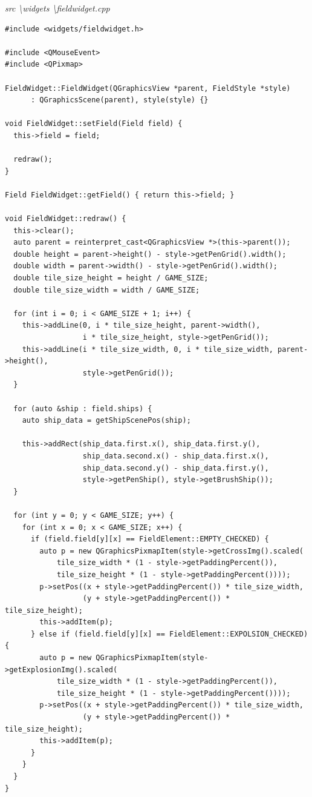 \documentclass[a4paper,14pt]{extarticle}
\begin{document}
\textit{src \textbackslash widgets \textbackslash fieldwidget.cpp}
\begin{verbatim}
#include <widgets/fieldwidget.h>

#include <QMouseEvent>
#include <QPixmap>

FieldWidget::FieldWidget(QGraphicsView *parent, FieldStyle *style)
      : QGraphicsScene(parent), style(style) {}

void FieldWidget::setField(Field field) {
  this->field = field;

  redraw();
}

Field FieldWidget::getField() { return this->field; }

void FieldWidget::redraw() {
  this->clear();
  auto parent = reinterpret_cast<QGraphicsView *>(this->parent());
  double height = parent->height() - style->getPenGrid().width();
  double width = parent->width() - style->getPenGrid().width();
  double tile_size_height = height / GAME_SIZE;
  double tile_size_width = width / GAME_SIZE;

  for (int i = 0; i < GAME_SIZE + 1; i++) {
    this->addLine(0, i * tile_size_height, parent->width(),
                  i * tile_size_height, style->getPenGrid());
    this->addLine(i * tile_size_width, 0, i * tile_size_width, parent->height(),
                  style->getPenGrid());
  }

  for (auto &ship : field.ships) {
    auto ship_data = getShipScenePos(ship);

    this->addRect(ship_data.first.x(), ship_data.first.y(),
                  ship_data.second.x() - ship_data.first.x(),
                  ship_data.second.y() - ship_data.first.y(),
                  style->getPenShip(), style->getBrushShip());
  }

  for (int y = 0; y < GAME_SIZE; y++) {
    for (int x = 0; x < GAME_SIZE; x++) {
      if (field.field[y][x] == FieldElement::EMPTY_CHECKED) {
        auto p = new QGraphicsPixmapItem(style->getCrossImg().scaled(
            tile_size_width * (1 - style->getPaddingPercent()),
            tile_size_height * (1 - style->getPaddingPercent())));
        p->setPos((x + style->getPaddingPercent()) * tile_size_width,
                  (y + style->getPaddingPercent()) * tile_size_height);
        this->addItem(p);
      } else if (field.field[y][x] == FieldElement::EXPOLSION_CHECKED) {
        auto p = new QGraphicsPixmapItem(style->getExplosionImg().scaled(
            tile_size_width * (1 - style->getPaddingPercent()),
            tile_size_height * (1 - style->getPaddingPercent())));
        p->setPos((x + style->getPaddingPercent()) * tile_size_width,
                  (y + style->getPaddingPercent()) * tile_size_height);
        this->addItem(p);
      }
    }
  }
}


\end{verbatim}
\end{document}
